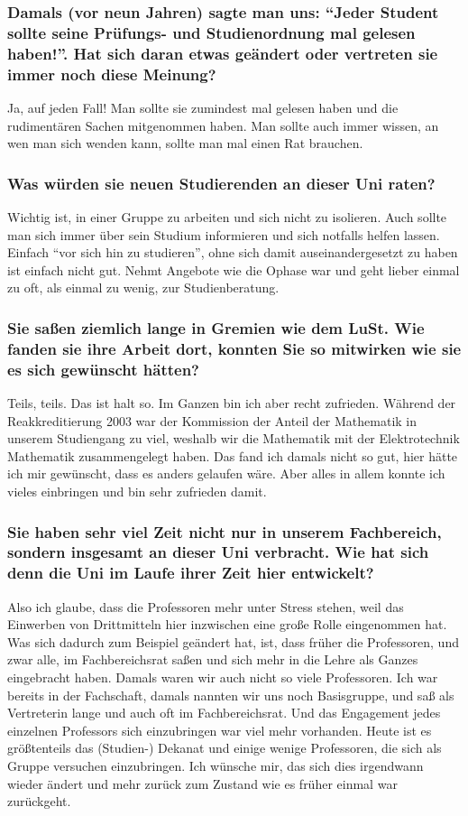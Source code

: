{\subsubsection*{Damals (vor neun Jahren) sagte man uns: "`Jeder Student sollte seine Prüfungs- und Studienordnung mal gelesen haben!"'. Hat sich daran etwas geändert oder vertreten sie immer noch diese Meinung?}
Ja, auf jeden Fall! Man sollte sie zumindest mal gelesen haben und die rudimentären Sachen mitgenommen haben. Man sollte auch immer wissen, an wen man sich wenden kann, sollte man mal einen Rat brauchen.
\subsubsection*{Was würden sie neuen Studierenden an dieser Uni raten?}
Wichtig ist, in einer Gruppe zu arbeiten und sich nicht zu isolieren. Auch sollte man sich immer über sein Studium informieren und sich notfalls helfen lassen. Einfach "`vor sich hin zu studieren"', ohne sich damit auseinandergesetzt zu haben ist einfach nicht gut. Nehmt Angebote wie die Ophase war und geht lieber einmal zu oft, als einmal zu wenig, zur Studienberatung.
\subsubsection*{Sie saßen ziemlich lange in Gremien wie dem LuSt. Wie fanden sie ihre Arbeit dort, konnten Sie so mitwirken wie sie es sich gewünscht hätten?}
Teils, teils. Das ist halt so. Im Ganzen bin ich aber recht zufrieden. Während der Reakkreditierung 2003 war der Kommission der Anteil der Mathematik in unserem Studiengang zu viel, weshalb wir die Mathematik  mit der Elektrotechnik Mathematik zusammengelegt haben. Das fand ich damals nicht so gut, hier hätte ich mir gewünscht, dass es anders gelaufen wäre. Aber alles in allem konnte ich vieles einbringen und bin sehr zufrieden damit.
\subsubsection*{Sie haben sehr viel Zeit nicht nur in unserem Fachbereich, sondern insgesamt an dieser Uni verbracht. Wie hat sich denn die Uni im Laufe ihrer Zeit hier entwickelt?}
Also ich glaube, dass die Professoren mehr unter Stress stehen, weil das Einwerben von Drittmitteln hier inzwischen eine große Rolle eingenommen hat. Was sich dadurch zum Beispiel geändert hat, ist, dass früher die Professoren, und zwar alle, im Fachbereichsrat saßen und sich mehr in die Lehre als Ganzes eingebracht haben. Damals waren wir auch nicht so viele Professoren. Ich war bereits in der Fachschaft, damals nannten wir uns noch Basisgruppe, und saß als Vertreterin lange und auch oft im Fachbereichsrat. Und das Engagement jedes einzelnen Professors sich einzubringen war viel mehr vorhanden. Heute ist es größtenteils das (Studien-) Dekanat und einige wenige Professoren, die sich als Gruppe versuchen einzubringen. Ich wünsche mir, das sich dies irgendwann wieder ändert und mehr zurück zum Zustand wie es früher einmal war zurückgeht.
}
